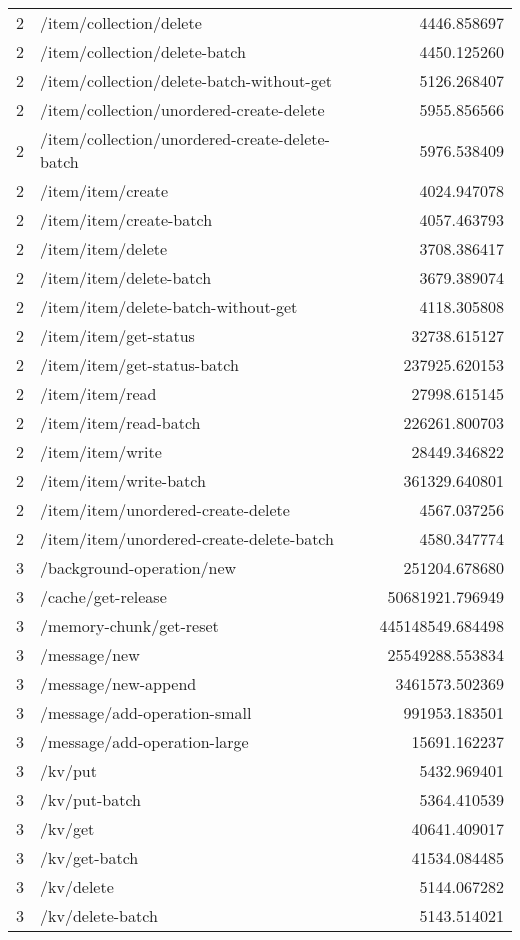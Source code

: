 \begin{longtable}{rlr}
2 & /item/collection/delete & 4446.858697 \\
2 & /item/collection/delete-batch & 4450.125260 \\
2 & /item/collection/delete-batch-without-get & 5126.268407 \\
2 & /item/collection/unordered-create-delete & 5955.856566 \\
2 & /item/collection/unordered-create-delete-batch & 5976.538409 \\
2 & /item/item/create & 4024.947078 \\
2 & /item/item/create-batch & 4057.463793 \\
2 & /item/item/delete & 3708.386417 \\
2 & /item/item/delete-batch & 3679.389074 \\
2 & /item/item/delete-batch-without-get & 4118.305808 \\
2 & /item/item/get-status & 32738.615127 \\
2 & /item/item/get-status-batch & 237925.620153 \\
2 & /item/item/read & 27998.615145 \\
2 & /item/item/read-batch & 226261.800703 \\
2 & /item/item/write & 28449.346822 \\
2 & /item/item/write-batch & 361329.640801 \\
2 & /item/item/unordered-create-delete & 4567.037256 \\
2 & /item/item/unordered-create-delete-batch & 4580.347774 \\
3 & /background-operation/new & 251204.678680 \\
3 & /cache/get-release & 50681921.796949 \\
3 & /memory-chunk/get-reset & 445148549.684498 \\
3 & /message/new & 25549288.553834 \\
3 & /message/new-append & 3461573.502369 \\
3 & /message/add-operation-small & 991953.183501 \\
3 & /message/add-operation-large & 15691.162237 \\
3 & /kv/put & 5432.969401 \\
3 & /kv/put-batch & 5364.410539 \\
3 & /kv/get & 40641.409017 \\
3 & /kv/get-batch & 41534.084485 \\
3 & /kv/delete & 5144.067282 \\
3 & /kv/delete-batch & 5143.514021 \\

\end{longtable}
